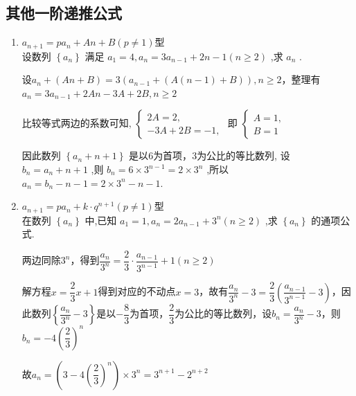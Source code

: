 \subsection*{其他一阶递推公式}
\begin{enumerate}
    \item $a_{n+1} = pa_n + An+B (p \neq 1)$型 \\
    设数列 $\left\{  {a}_{n}\right\}$ 满足 ${a}_{1} = 4,{a}_{n} = 3{a}_{n - 1} + {2n} - 1\left( {n \geq  2}\right)$ ,求 ${a}_{n}$ .
    \begin{jieda}
        设$a_n + (An+B) = 3(a_{n-1} + (A(n-1)+B)), n \geq 2$，整理有$a_n = 3a_{n-1} + 2An - 3A + 2B, n \geq 2$
        
        比较等式两边的系数可知, $\left\{  \begin{array}{l} 
                                            2A = 2, \\  
                                            - 3A + 2B = -1, 
                                        \end{array}\right.$ 
        即 $\left\{  \begin{array}{l} A = 1, \\  B = 1 \end{array}\right.$ 
        
        因此数列 $\left\{  a_n + n + 1\right\}$ 是以$6$为首项，$3$为公比的等比数列,
        设${b}_{n} = {a}_{n} + n + 1$ ,则 ${b}_{n} = 6 \times  {3}^{n - 1} = 2 \times  {3}^{n}$ ,所以 ${a}_{n} = {b}_{n} - n - 1 = 2 \times  {3}^{n} - n - 1.$
    \end{jieda}
    
    \item $a_{n+1} = pa_n + k \cdot q^{n+1} (p \neq 1)$型 \\
    在数列 $\left\{  {a}_{n}\right\}$ 中,已知 ${a}_{1} = 1,{a}_{n} = 2{a}_{n - 1} + {3}^{n}\left( {n \geq  2}\right)$ ,求 $\left\{  {a}_{n}\right\}$ 的通项公式.
    \begin{jieda}
        两边同除$3^n$，得到$\dfrac{a_n}{3^n} = \dfrac{2}{3} \cdot \dfrac{a_{n-1}}{3^{n-1}} + 1\left( {n \geq  2}\right)$

        解方程$x = \dfrac{2}{3}x + 1$得到对应的不动点$x = 3$，故有$\dfrac{a_n}{3^n} - 3 = \dfrac{2}{3}\left(\dfrac{a_{n-1}}{3^{n-1}} - 3\right)$，因此数列$\left\{\dfrac{a_n}{3^n} - 3\right\}$是以$-\dfrac{8}{3}$为首项，$\dfrac{2}{3}$为公比的等比数列，设$b_n = \dfrac{a_n}{3^n} - 3$，则$b_n = -4\left(\dfrac{2}{3}\right)^n$
        
        故$a_n = \left(3-4\left(\dfrac{2}{3}\right)^n\right) \times 3^n = 3^{n+1}-2^{n+2}$
    \end{jieda} 


\end{enumerate}
